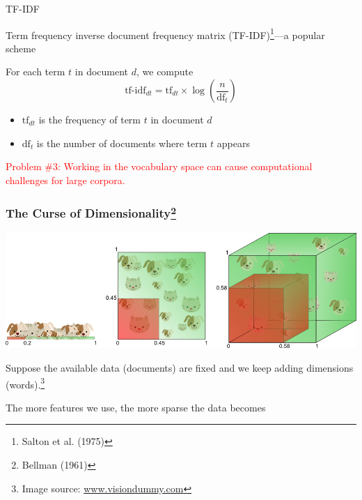 \documentclass[compress,mathserif,t]{beamer} %
\begin{document}
\begin{frame}[noframenumbering]{TF-IDF} 
	
	Term frequency inverse document frequency matrix 
	(TF-IDF)\footnote{Salton et al. (1975)}---a popular scheme
	
	\vspace{1cm}
	
	For each term $t$ in document $d$, we 
	compute 
	\[ \text{tf-idf}_{dt}  = \text{tf}_{dt} 
	\times \log  \left ( 
	\frac{n}{\text{df}_{t}} \right )  \]
	\begin{itemize}
		\item $\text{tf}_{dt}$ is the 
		frequency of term $t$ in document $d$
		\item $\text{df}_{t}$ is the number of 
		documents where term $t$ 
		appears
	\end{itemize}
	
	\vspace{1cm}
	
	\textcolor{red}{Problem \#3: Working 
		in the vocabulary space can cause 
		computational challenges for large 
		corpora.}
	
\end{frame}

\begin{frame}
	\frametitle{The Curse of Dimensionality\footnote{Bellman (1961)}}
	\includegraphics[width=1.\linewidth]{curseofdimensionality}
	
	
	Suppose the available data (documents) are 
	fixed and we keep adding 
	dimensions (words).\footnote{Image source: 
		\url{www.visiondummy.com}} 
	\\  
	\vspace{1cm}
	
	The more features we use, the more sparse 
	the data becomes
	
	
	
\end{frame}
\end{document}
